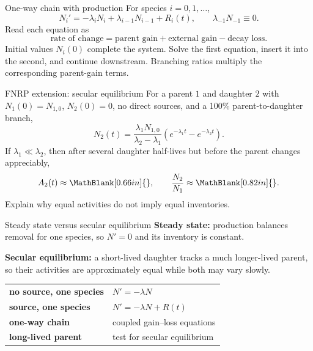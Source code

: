 \begin{handoutcolumns}

\begin{fixedbox}{One-way chain with production}
For species $i=0,1,\ldots$,
\[
 \boxed{N_i'
 =-\lambda_iN_i
 +\lambda_{i-1}N_{i-1}
 +R_i(t)},
 \qquad \lambda_{-1}N_{-1}\equiv0.
\]
Read each equation as
\[
 \text{rate of change}=\text{parent gain}+\text{external gain}-\text{decay loss}.
\]
Initial values $N_i(0)$ complete the system.  Solve the first equation, insert
it into the second, and continue downstream.  Branching ratios multiply the
corresponding parent-gain terms.
\end{fixedbox}

\begin{boardbox}{FNRP extension: secular equilibrium}
For a parent $1$ and daughter $2$ with $N_1(0)=N_{1,0}$, $N_2(0)=0$, no direct
sources, and a 100\% parent-to-daughter branch,
\[
 N_2(t)=\frac{\lambda_1N_{1,0}}{\lambda_2-\lambda_1}
 \left(e^{-\lambda_1t}-e^{-\lambda_2t}\right).
\]
If $\lambda_1\ll\lambda_2$, then after several daughter half-lives but before
the parent changes appreciably,
\[
 A_2(t)\approx\MathBlank[0.66in]{},
 \qquad
 \frac{N_2}{N_1}\approx\MathBlank[0.82in]{}.
\]
Explain why equal activities do not imply equal inventories.
\end{boardbox}

\begin{fixedbox}{Steady state versus secular equilibrium}
\textbf{Steady state:} production balances removal for one species, so
$N'=0$ and its inventory is constant.\par
\smallskip
\textbf{Secular equilibrium:} a short-lived daughter tracks a much
longer-lived parent, so their activities are approximately equal while both
may vary slowly.
\end{fixedbox}

\begin{takeawaybox}
\begin{tabularx}{\linewidth}{@{}>{\bfseries}l X@{}}
no source, one species & $N'=-\lambda N$\\
source, one species & $N'=-\lambda N+R(t)$\\
one-way chain & coupled gain--loss equations\\
long-lived parent & test for secular equilibrium
\end{tabularx}
\end{takeawaybox}

\end{handoutcolumns}

